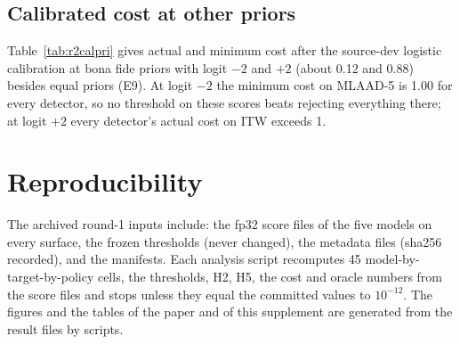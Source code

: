 \documentclass[10pt]{article}
\newcommand{\wide}[1]{\begingroup\footnotesize\setlength{\tabcolsep}{3.5pt}\resizebox{\textwidth}{!}{}\endgroup}
\begin{document}
\begin{table}[!ht]
\caption{Three-zone review at the 10\% dev budget on every target (E7; \% of target clips; columns as in the main
paper's ITW table: Gen.\ in review = genuine clips sent to review, Gen.\ rej.\ = genuine clips rejected automatically,
Spoof acc.\ = spoofs accepted automatically).}
\label{tab:r2threeall}
\centering
\wide{r2s_threezone}
\end{table}

\begin{table}[!ht]
\caption{Three-zone review on ITW at review budgets of 5, 10 and 20\% of dev traffic: the band designed on dev, the same
budget at the labelled target oracle, and the label-free re-anchoring (E7; \% of ITW clips; Rej. = genuine clips
auto-rejected; Acc. = spoofs auto-accepted).}
\label{tab:r2budgets}
\centering
\wide{r2s_budgets}
\end{table}

\subsection{Calibrated cost at other priors}
Table~\ref{tab:r2calpri} gives actual and minimum cost after the source-dev logistic calibration at bona fide priors with
logit \(-2\) and \(+2\) (about 0.12 and 0.88) besides equal priors (E9). At logit \(-2\) the minimum cost on MLAAD-5 is 1.00
for every detector, so no threshold on these scores beats rejecting everything there; at logit \(+2\) every detector's
actual cost on ITW exceeds 1.

\begin{table}[!ht]
\caption{Actual/minimum normalised cost after logistic calibration on source dev, at three bona fide priors (E9).}
\label{tab:r2calpri}
\centering
\footnotesize

\end{table}

\section{Reproducibility}
The archived round-1 inputs include: the fp32 score files of the five models on every surface, the frozen thresholds (never changed), the metadata files
(sha256 recorded), and the manifests. Each analysis script recomputes 45 model-by-target-by-policy cells, the thresholds, H2, H5, the cost and
oracle numbers from the score files and stops unless they equal the committed values to \(10^{-12}\). The figures and the tables of the
paper and of this supplement are generated from the result files by scripts.



\end{document}
